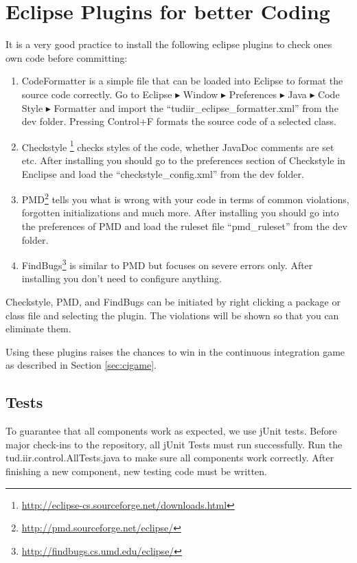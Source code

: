 \documentclass[a4paper,twoside]{book}      %
\begin{document}
\section{Eclipse Plugins for better Coding}
\label{sec:eclipseCodingPlugins}
It is a very good practice to install the following eclipse plugins to check ones own code before committing:
\begin{enumerate}
\item CodeFormatter is a simple file that can be loaded into Eclipse to format the source code correctly. Go to Eclipse $\blacktriangleright$ Window $\blacktriangleright$ Preferences $\blacktriangleright$ Java $\blacktriangleright$ Code Style $\blacktriangleright$ Formatter and import the ``tudiir\_eclipse\_formatter.xml'' from the dev folder. Pressing Control+F formats the source code of a selected class.
\item Checkstyle \footnote{\url{http://eclipse-cs.sourceforge.net/downloads.html}} checks styles of the code, whether JavaDoc comments are set etc. After installing you should go to the preferences section of Checkstyle in Enclipse and load the ``checkstyle\_config.xml'' from the dev folder.
\item PMD\footnote{\url{http://pmd.sourceforge.net/eclipse/}} tells you what is wrong with your code in terms of common violations, forgotten initializations and much more. After installing you should go into the preferences of PMD and load the ruleset file ``pmd\_ruleset'' from the dev folder.
\item FindBugs\footnote{\url{http://findbugs.cs.umd.edu/eclipse/}} is similar to PMD but focuses on severe errors only. After installing you don't need to configure anything.
\end{enumerate}

Checkstyle, PMD, and FindBugs can be initiated by right clicking a package or class file and selecting the plugin. The violations will be shown so that you can eliminate them.

Using these plugins raises the chances to win in the continuous integration game as described in Section \ref{sec:cigame}.

\subsection{Tests}
To guarantee that all components work as expected, we use jUnit tests. Before major check-ins to the repository, all jUnit Tests must run successfully. Run the tud.iir.control.AllTests.java to make sure all components work correctly.
After finishing a new component, new testing code must be written.
\end{document}
